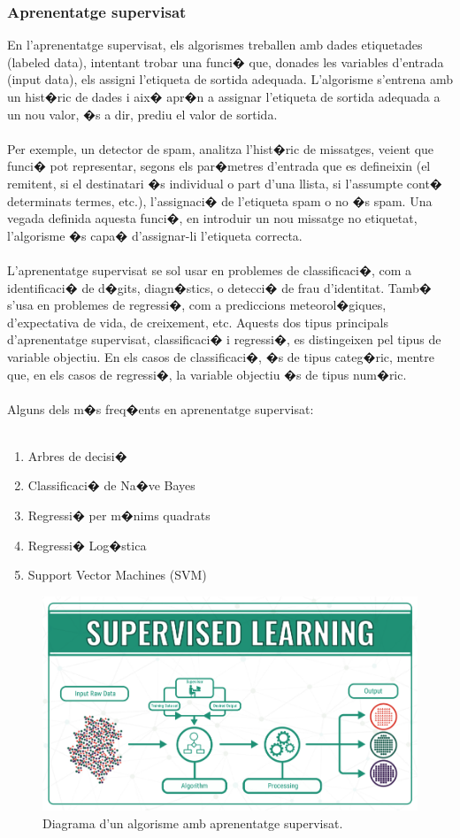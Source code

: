 \documentclass[12pt,a4paper,openright,oneside]{article}
\numberwithin{equation}{section}
\theoremstyle{definition}
\begin{document}
\subsubsection{Aprenentatge supervisat}
En l'aprenentatge supervisat, els algorismes treballen amb dades etiquetades (labeled data), intentant trobar una funci� que, donades les variables d'entrada (input data), els assigni l'etiqueta de sortida adequada. L'algorisme s'entrena amb un hist�ric de dades i aix� apr�n a assignar l'etiqueta de sortida adequada a un nou valor, �s a dir, prediu el valor de sortida.
\\\\
Per exemple, un detector de spam, analitza l'hist�ric de missatges, veient que funci� pot representar, segons els par�metres d'entrada que es defineixin (el remitent, si el destinatari �s individual o part d'una llista, si l'assumpte cont� determinats termes, etc.), l'assignaci� de l'etiqueta spam o no �s spam. Una vegada definida aquesta funci�, en introduir un nou missatge no etiquetat, l'algorisme �s capa� d'assignar-li l'etiqueta correcta.
\\\\
L'aprenentatge supervisat se sol usar en problemes de classificaci�, com a identificaci� de d�gits, diagn�stics, o detecci� de frau d'identitat. Tamb� s'usa en problemes de regressi�, com a prediccions meteorol�giques, d'expectativa de vida, de creixement, etc. Aquests dos tipus principals d'aprenentatge supervisat, classificaci� i regressi�, es distingeixen pel tipus de variable objectiu. En els casos de classificaci�, �s de tipus categ�ric, mentre que, en els casos de regressi�, la variable objectiu �s de tipus num�ric.
\\\\
Alguns dels m�s freq�ents en aprenentatge supervisat:
\\\
\begin{enumerate}
\item Arbres de decisi�
\item Classificaci� de Na�ve Bayes
\item Regressi� per m�nims quadrats
\item Regressi� Log�stica
\item Support Vector Machines (SVM)
\end{enumerate}
\begin{figure}[h!]
\begin{center}
\includegraphics[width=.8\textwidth]{supervised}
\caption{Diagrama d'un algorisme amb aprenentatge supervisat.}
\end{center}
\end{figure}
\newpage
\end{document}
